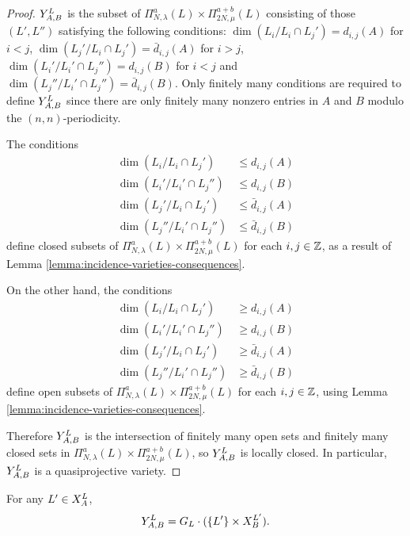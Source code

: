 \documentclass[a4paper, 11pt, twoside]{report}
\begin{document}
\begin{proof}
$\yprod[L]{A,B}$ is the subset of $\Pi_{N,\lambda}^a(L)\times\Pi_{2N,\mu}^{a+b}(L)$ consisting of those $(L',L'')$ satisfying the following conditions: $\dim(L_i/{L_i\cap L_j'}) = d_{i,j}{(A)}$ for $i<j$, $\dim(L_j'/{L_i\cap L_j'})=\bar{d}_{i,j}{(A)}$ for $i>j$, $\dim(L_i'/{L_i'\cap L_j''})=d_{i,j}{(B)}$ for $i<j$ and $\dim(L_j''/{L_i'\cap L_j''})=\bar{d}_{i,j}{(B)}$. Only finitely many conditions are required to define $\yprod[L]{A,B}$ since there are only finitely many nonzero entries in $A$ and $B$ modulo the $(n,n)$-periodicity.

The conditions
\begin{align*}
\dim(L_i/{L_i\cap L_j'}) &\le d_{i,j}{(A)}\\
\dim(L_i'/{L_i'\cap L_j''}) &\le d_{i,j}{(B)}\\
\dim(L_j'/{L_i\cap L_j'}) &\le\bar{d}_{i,j}{(A)}\\
\dim(L_j''/{L_i'\cap L_j''}) &\le\bar{d}_{i,j}{(B)}
\end{align*}
define closed subsets of $\Pi_{N,\lambda}^a(L)\times\Pi_{2N,\mu}^{a+b}(L)$ for each $i,j\in\integers$, as a result of Lemma \ref{lemma:incidence-varieties-consequences}.

On the other hand, the conditions
\begin{align*}
\dim(L_i/{L_i\cap L_j'}) &\geq d_{i,j}{(A)}\\
\dim(L_i'/{L_i'\cap L_j''}) &\geq d_{i,j}{(B)}\\
\dim(L_j'/{L_i\cap L_j'}) &\geq \bar{d}_{i,j}{(A)}\\
\dim(L_j''/{L_i'\cap L_j''}) &\geq \bar{d}_{i,j}{(B)}
\end{align*}
define open subsets of $\Pi_{N,\lambda}^a(L)\times\Pi_{2N,\mu}^{a+b}(L)$ for each $i,j\in\integers$, using Lemma \ref{lemma:incidence-varieties-consequences}.

Therefore $\yprod[L]{A,B}$ is the intersection of finitely many open sets and finitely many closed sets in $\Pi_{N,\lambda}^a(L)\times\Pi_{2N,\mu}^{a+b}(L)$, so $\yprod[L]{A,B}$ is locally closed. In particular, $\yprod[L]{A,B}$ is a quasiprojective variety.
\end{proof}

\begin{lemma}\label{lemma:yprod-as-a-saturation}
For any $L'\in\xprod[L]{A}$,
\begin{equation*}
\yprod[L]{A,B} = G_L\cdot(\{L'\}\times\xprod[L']{B}).
\end{equation*}
\end{lemma}
\end{document}
